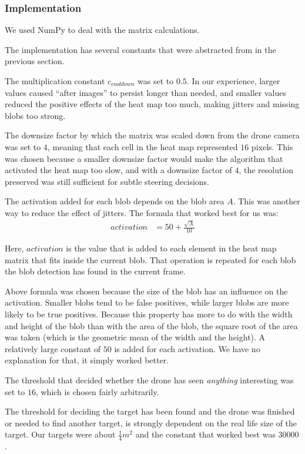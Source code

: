 \documentclass[a4paper,10pt]{article}
\begin{document}
\subsubsection{Implementation}
We used NumPy to deal with the matrix calculations.

The implementation has several constants that were abstracted from in the
previous section.

The multiplication constant $c_{{cooldown}}$ was set to
$0.5$. In our experience, larger values caused ``after images'' to persist
longer than needed, and smaller values reduced the positive effects of
the heat map too much, making jitters and missing blobs too strong.

The downsize factor by which the matrix was scaled down from the
drone camera was set to $4$, meaning that each cell in the heat map represented $16$
pixels. This was chosen because a smaller downsize factor would make the
algorithm that activated the heat map too slow, and with a downsize factor of
$4$, the resolution preserved was still sufficient for subtle steering
decisions.

The activation added for each blob depends on the blob area $A$. This was
another way to reduce the effect of jitters. The formula
that worked best for us was:
\begin{align*}
 activation &=50 + \frac{\sqrt{A}}{10}
\end{align*}

Here, $activation$ is the value that is added to each element in the
heat map matrix that fits inside the current blob. That operation is
repeated for each blob the blob detection has found in the current frame.

Above formula was chosen because the size of the blob has an influence on the
activation. Smaller blobs tend to be false positives, while larger
blobs are more likely to be true positives. Because this property has
more to do with the width and height of the blob than with the area
of the blob, the square root of the area was taken (which is the
geometric mean of the width and the height). A relatively large
constant of $50$ is added for each activation. We have no explanation for
that, it simply worked better.

The threshold that decided whether the drone has seen \emph{anything}
interesting was set to $16$, which is chosen fairly arbitrarily.

The threshold for deciding the target has been found and the drone was
finished or needed to find another target, is strongly dependent on the
real life size of the target. Our targets were about $\frac{1}{4} m^2$
and the constant that worked best was $30 000$.
\end{document}
